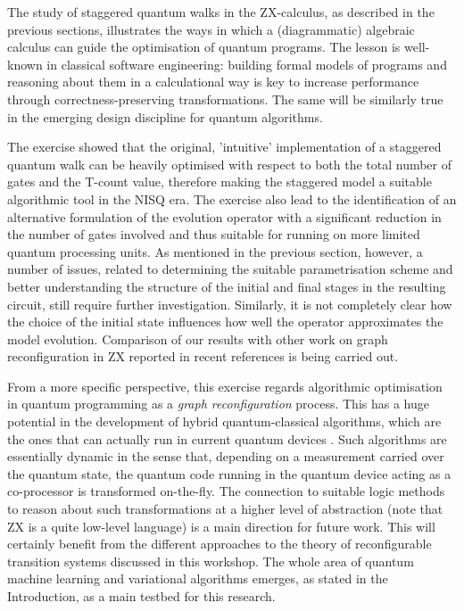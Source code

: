  The study of staggered quantum walks in the ZX-calculus, as described in the previous sections, illustrates the ways in which a (diagrammatic) algebraic calculus can guide the optimisation of quantum programs. The lesson is well-known in classical software engineering: building formal models of programs and reasoning about them in a calculational way is key to increase performance through correctness-preserving transformations. The same will be similarly true in the emerging design discipline for quantum algorithms.




The exercise showed that the original, 'intuitive' implementation of a staggered quantum walk can be heavily optimised with respect to both the total number of gates and the T-count value, therefore making the staggered model a suitable algorithmic tool in the NISQ era\cite{Preskill2018}. The exercise also lead to the identification of an alternative formulation of the evolution operator with a significant reduction in the number of gates involved and thus suitable for running on more limited quantum processing units. As mentioned in the previous section, however, a number of issues, related to determining the  suitable parametrisation scheme and better understanding the structure of the initial and final stages in the resulting circuit,  still require further investigation. Similarly, it is not completely  clear how the choice of the initial state 
influences how well the operator approximates the model evolution. Comparison of our results with other work on graph reconfiguration in ZX reported in recent references \cite{Dun20,Ufr23} is being carried out.


From a more specific perspective, this exercise regards algorithmic optimisation  in quantum programming  as a \emph{graph reconfiguration} process. This has a huge potential in the development of hybrid quantum-classical algorithms, which are the ones that can actually run in current quantum devices \cite{Preskill2018}. Such algorithms are essentially dynamic in the sense that, depending on a measurement carried over the quantum state, the quantum code running in the quantum device acting as a co-processor is transformed on-the-fly. The connection to suitable logic methods to reason about such transformations at a higher level of abstraction (note that ZX is a quite low-level language) is a main direction for future work. This will certainly benefit from the different approaches to the theory of reconfigurable transition systems discussed in this workshop. The whole area of quantum machine learning and variational algorithms  \cite{Dun16,Cer21} emerges, as stated in the Introduction, as a main testbed for this research.

